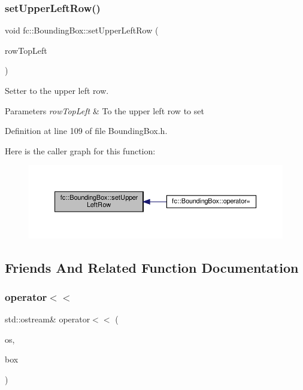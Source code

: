 \subsubsection{\texorpdfstring{set\+Upper\+Left\+Row()}{setUpperLeftRow()}}
{\footnotesize\ttfamily void fc\+::\+Bounding\+Box\+::set\+Upper\+Left\+Row (\begin{DoxyParamCaption}\item[{uint32\+\_\+t}]{row\+Top\+Left }\end{DoxyParamCaption})\hspace{0.3cm}{\ttfamily [inline]}}



Setter to the upper left row. 


\begin{DoxyParams}{Parameters}
{\em row\+Top\+Left} & To the upper left row to set \\
\hline
\end{DoxyParams}


Definition at line 109 of file Bounding\+Box.\+h.

Here is the caller graph for this function\+:
\nopagebreak
\begin{figure}[H]
\begin{center}
\leavevmode
\includegraphics[width=350pt]{db/dc1/classfc_1_1BoundingBox_a8007ac29ae2e3f15bfccf71d6f318716_icgraph}
\end{center}
\end{figure}


\subsection{Friends And Related Function Documentation}
\mbox{\label{classfc_1_1BoundingBox_a9b77edf50fd5d4a4bd03dda7eb3054fe}} 
\subsubsection{\texorpdfstring{operator$<$$<$}{operator<<}}
{\footnotesize\ttfamily std\+::ostream\& operator$<$$<$ (\begin{DoxyParamCaption}\item[{std\+::ostream \&}]{os,  }\item[{const \hyperlink{classfc_1_1BoundingBox}{Bounding\+Box} \&}]{box }\end{DoxyParamCaption})\hspace{0.3cm}{\ttfamily [friend]}}



